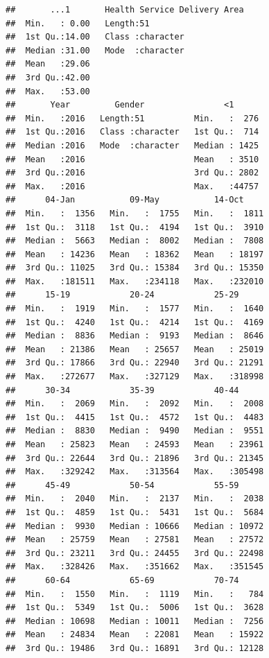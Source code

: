\documentclass[
  11pt,
  oneside]{book}
\begin{document}
\begin{verbatim}
##       ...1       Health Service Delivery Area
##  Min.   : 0.00   Length:51                   
##  1st Qu.:14.00   Class :character            
##  Median :31.00   Mode  :character            
##  Mean   :29.06                               
##  3rd Qu.:42.00                               
##  Max.   :53.00                               
##       Year         Gender                <1       
##  Min.   :2016   Length:51          Min.   :  276  
##  1st Qu.:2016   Class :character   1st Qu.:  714  
##  Median :2016   Mode  :character   Median : 1425  
##  Mean   :2016                      Mean   : 3510  
##  3rd Qu.:2016                      3rd Qu.: 2802  
##  Max.   :2016                      Max.   :44757  
##      04-Jan           09-May           14-Oct      
##  Min.   :  1356   Min.   :  1755   Min.   :  1811  
##  1st Qu.:  3118   1st Qu.:  4194   1st Qu.:  3910  
##  Median :  5663   Median :  8002   Median :  7808  
##  Mean   : 14236   Mean   : 18362   Mean   : 18197  
##  3rd Qu.: 11025   3rd Qu.: 15384   3rd Qu.: 15350  
##  Max.   :181511   Max.   :234118   Max.   :232010  
##      15-19            20-24            25-29       
##  Min.   :  1919   Min.   :  1577   Min.   :  1640  
##  1st Qu.:  4240   1st Qu.:  4214   1st Qu.:  4169  
##  Median :  8836   Median :  9193   Median :  8646  
##  Mean   : 21386   Mean   : 25657   Mean   : 25019  
##  3rd Qu.: 17866   3rd Qu.: 22940   3rd Qu.: 21291  
##  Max.   :272677   Max.   :327129   Max.   :318998  
##      30-34            35-39            40-44       
##  Min.   :  2069   Min.   :  2092   Min.   :  2008  
##  1st Qu.:  4415   1st Qu.:  4572   1st Qu.:  4483  
##  Median :  8830   Median :  9490   Median :  9551  
##  Mean   : 25823   Mean   : 24593   Mean   : 23961  
##  3rd Qu.: 22644   3rd Qu.: 21896   3rd Qu.: 21345  
##  Max.   :329242   Max.   :313564   Max.   :305498  
##      45-49            50-54            55-59       
##  Min.   :  2040   Min.   :  2137   Min.   :  2038  
##  1st Qu.:  4859   1st Qu.:  5431   1st Qu.:  5684  
##  Median :  9930   Median : 10666   Median : 10972  
##  Mean   : 25759   Mean   : 27581   Mean   : 27572  
##  3rd Qu.: 23211   3rd Qu.: 24455   3rd Qu.: 22498  
##  Max.   :328426   Max.   :351662   Max.   :351545  
##      60-64            65-69            70-74       
##  Min.   :  1550   Min.   :  1119   Min.   :   784  
##  1st Qu.:  5349   1st Qu.:  5006   1st Qu.:  3628  
##  Median : 10698   Median : 10011   Median :  7256  
##  Mean   : 24834   Mean   : 22081   Mean   : 15922  
##  3rd Qu.: 19486   3rd Qu.: 16891   3rd Qu.: 12128  

\end{verbatim}
\end{document}
